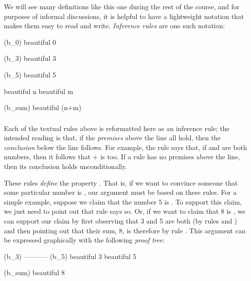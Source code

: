 \documentclass[12pt]{report}
\begin{document}
 We will see many definitions like this one during the rest
    of the course, and for purposes of informal discussions, it is
    helpful to have a lightweight notation that makes them easy to
    read and write.  \textit{Inference rules} are one such notation: \par
\noindent\hrulefill\par
\noindent{}                               (b\_0)
                              beautiful 0
\par
\noindent\hrulefill\par
\noindent{}                              (b\_3)
                              beautiful 3
\par
\noindent\hrulefill\par
\noindent{}                              (b\_5)
                              beautiful 5    


                       beautiful n     beautiful m
\par
\noindent\hrulefill\par
\noindent{}                      (b\_sum)
                              beautiful (n+m)   


\subsubsection{ }

 Each of the textual rules above is reformatted here as an
    inference rule; the intended reading is that, if the \textit{premises}
    above the line all hold, then the \textit{conclusion} below the line
    follows.  For example, the rule  says that, if  and 
    are both  numbers, then it follows that + is
     too.  If a rule has no premises above the line, then
    its conclusion holds unconditionally.


    These rules \textit{define} the property .  That is, if we
    want to convince someone that some particular number is ,
    our argument must be based on these rules.  For a simple example,
    suppose we claim that the number 5 is .  To support
    this claim, we just need to point out that rule  says so.
    Or, if we want to claim that 8 is , we can support our
    claim by first observing that 3 and 5 are both  (by
    rules  and ) and then pointing out that their sum, 8,
    is therefore  by rule .  This argument can be
    expressed graphically with the following \textit{proof tree}: \par
\noindent\hrulefill\par
\noindent{} (b\_3)   ----------- (b\_5)
         beautiful 3         beautiful 5
\par
\noindent\hrulefill\par
\noindent{} (b\_sum)
                   beautiful 8   
\end{document}
